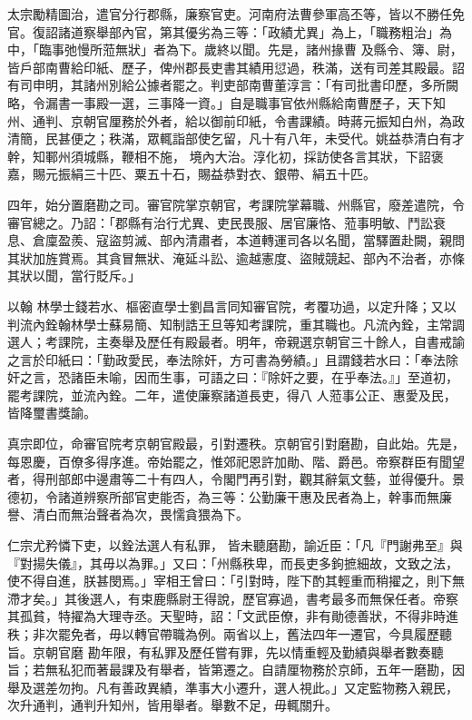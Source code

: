 \begin{pinyinscope}
 太宗勵精圖治，遣官分行郡縣，廉察官吏。河南府法曹參軍高丕等，皆以不勝任免官。復詔諸道察舉部內官，第其優劣為三等：「政績尤異」為上，「職務粗治」為中，「臨事弛慢所蒞無狀」者為下。歲終以聞。先是，諸州掾曹
 及縣令、簿、尉，皆戶部南曹給印紙、歷子，俾州郡長吏書其績用愆過，秩滿，送有司差其殿最。詔有司申明，其諸州別給公據者罷之。判吏部南曹董淳言：「有司批書印歷，多所闕略，令漏書一事殿一選，三事降一資。」自是職事官依州縣給南曹歷子，天下知州、通判、京朝官厘務於外者，給以御前印紙，令書課績。時蔣元振知白州，為政清簡，民甚便之；秩滿，眾輒詣部使乞留，凡十有八年，未受代。姚益恭清白有才幹，知鄆州須城縣，鞭相不施，
 境內大治。淳化初，採訪使各言其狀，下詔褒嘉，賜元振絹三十匹、粟五十石，賜益恭對衣、銀帶、絹五十匹。



 四年，始分置磨勘之司。審官院掌京朝官，考課院掌幕職、州縣官，廢差遣院，令審官總之。乃詔：「郡縣有治行尤異、吏民畏服、居官廉恪、蒞事明敏、鬥訟衰息、倉廩盈羨、寇盜剪滅、部內清肅者，本道轉運司各以名聞，當驛置赴闕，親問其狀加旌賞焉。其貪冒無狀、淹延斗訟、逾越憲度、盜賊競起、部內不治者，亦條其狀以聞，當行貶斥。」



 以翰
 林學士錢若水、樞密直學士劉昌言同知審官院，考覆功過，以定升降；又以判流內銓翰林學士蘇易簡、知制誥王旦等知考課院，重其職也。凡流內銓，主常調選人；考課院，主奏舉及歷任有殿最者。明年，帝親選京朝官三十餘人，自書戒諭之言於印紙曰：「勤政愛民，奉法除奸，方可書為勞績。」且謂錢若水曰：「奉法除奸之言，恐諸臣未喻，因而生事，可語之曰：『除奸之要，在乎奉法。』」至道初，罷考課院，並流內銓。二年，遣使廉察諸道長吏，得八
 人蒞事公正、惠愛及民，皆降璽書獎諭。



 真宗即位，命審官院考京朝官殿最，引對遷秩。京朝官引對磨勘，自此始。先是，每恩慶，百僚多得序進。帝始罷之，惟郊祀恩許加勛、階、爵邑。帝察群臣有聞望者，得刑部郎中邊肅等二十有四人，令閣門再引對，觀其辭氣文藝，並得優升。景德初，令諸道辨察所部官吏能否，為三等：公勤廉干惠及民者為上，幹事而無廉譽、清白而無治聲者為次，畏懦貪猥為下。



 仁宗尤矜憐下吏，以銓法選人有私罪，
 皆未聽磨勘，諭近臣：「凡『門謝弗至』與『對揚失儀』，其毋以為罪。」又曰：「州縣秩卑，而長吏多鉤摭細故，文致之法，使不得自進，朕甚閔焉。」宰相王曾曰：「引對時，陛下酌其輕重而稍擢之，則下無滯才矣。」其後選人，有束鹿縣尉王得說，歷官寡過，書考最多而無保任者。帝察其孤貧，特擢為大理寺丞。天聖時，詔：「文武臣僚，非有勛德善狀，不得非時進秩；非次罷免者，毋以轉官帶職為例。兩省以上，舊法四年一遷官，今具履歷聽旨。京朝官磨
 勘年限，有私罪及歷任嘗有罪，先以情重輕及勤績與舉者數奏聽旨；若無私犯而著最課及有舉者，皆第遷之。自請厘物務於京師，五年一磨勘，因舉及選差勿拘。凡有善政異績，準事大小遷升，選人視此。」又定監物務入親民，次升通判，通判升知州，皆用舉者。舉數不足，毋輒關升。




\end{pinyinscope}
